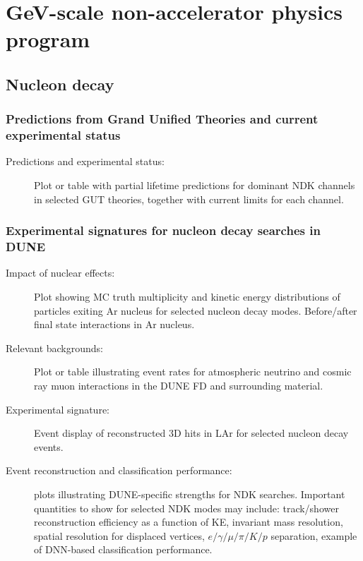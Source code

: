 \chapter{GeV-scale non-accelerator physics program}
\label{ch:nonaccel}


\section{Nucleon decay}
\label{sec:nonaccel-ndk}

\subsection{Predictions from Grand Unified Theories and current experimental status}
\label{subsec:nonaccel-ndk-status}

\begin{description}
\item[Predictions and experimental status:] Plot or table with partial lifetime predictions for dominant NDK channels in selected GUT theories, together with current limits for each channel.
\end{description}

\subsection{Experimental signatures for nucleon decay searches in DUNE}
\label{subsec:nonaccel-ndk-dune}

\begin{description}
\item[Impact of nuclear effects:] Plot showing MC truth multiplicity and kinetic energy distributions of particles exiting Ar nucleus for selected nucleon decay modes. Before/after final state interactions in Ar nucleus.
\item[Relevant backgrounds:] Plot or table illustrating event rates for atmospheric neutrino and cosmic ray muon interactions in the DUNE FD and surrounding material.
\item[Experimental signature:] Event display of reconstructed 3D hits in LAr for selected nucleon decay events.
\item[Event reconstruction and classification performance:] plots illustrating DUNE-specific strengths for NDK searches. Important quantities to show for selected NDK modes may include: track/shower reconstruction efficiency as a function of KE, invariant mass resolution, spatial resolution for displaced vertices, $e/\gamma/\mu/\pi/K/p$ separation, example of DNN-based classification performance.  
\end{description}

